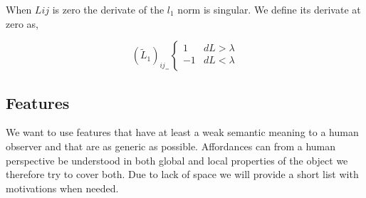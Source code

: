 \normalsize

When \(L{ij}\) is zero the derivate of the \(l_1\) norm is singular. We
define its derivate at zero as,

\begin{equation}
 ( \tilde{L}_1 )_{ij}_ =
  \begin{cases}
    1   & dL > \lambda \\
    -1  & dL < \lambda \\
  \end{cases}
\end{equation}

\begin{comment}
[We should maybe investigate if the penalization has the same effect on the eigenvalues as ridge regression ]
\end{comment}

\subsection{Features}\label{features}

We want to use features that have at least a weak semantic meaning to a
human observer and that are as generic as possible. Affordances can from
a human perspective be understood in both global and local properties of
the object we therefore try to cover both. Due to lack of space we will
provide a short list with motivations when needed.

